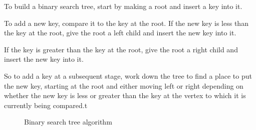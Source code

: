 \documentclass{report}
\begin{document}
\begin{mdframed}
 \begin{large}
	 \vspace{2mm}

  To build a binary search tree, start by making a root and insert a key into it.
  \vspace{5mm}

\noindent To add a new key, compare it to the key at the root. If the new key is less than the key at the root, give the root a left child and insert the new key into it.
\vspace{4mm}

\noindent If the key is greater than the key at the root, give the root a right child and insert the new key into it.
\vspace{4mm}

\noindent So to add a key at a subsequent stage, work down the tree to find a place to put the new key, starting at the root and either moving left or right depending on whether the new key is less or greater than the key at the vertex to which it is currently being compared.t
 \end{large} 

\end{mdframed}
\pagebreak
\begin{figure}[ht]
  \centering
  \hfill
  \caption{Binary search tree algorithm}
\end{figure}
\bigbreak \noindent \bigbreak \noindent
{}
\end{document}
